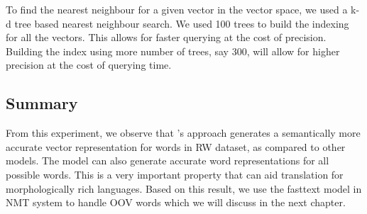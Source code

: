 To find the nearest neighbour for a given vector in the vector space, we used a k-d tree based nearest neighbour search. We used 100 trees to build the indexing for all the vectors. This allows for faster querying at the cost of precision. Building the index using more number of trees, say 300, will allow for higher precision at the cost of querying time.


\subsection*{Summary}
From this experiment, we observe that \citeauthor{bojanowski2016enriching}'s approach generates a  semantically more accurate vector representation for words in RW dataset, as compared to other models. The model can also generate accurate word representations for all possible words. This is a very important property that can aid translation for morphologically rich languages. Based on this result, we use the fasttext model in NMT system to handle OOV words which we will discuss in the next chapter.